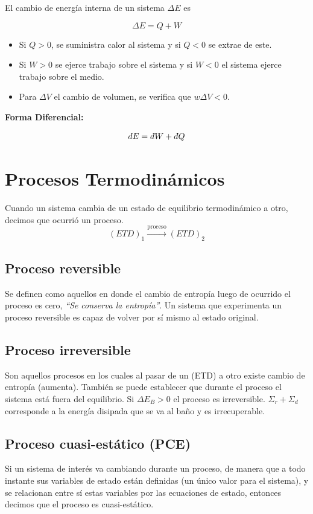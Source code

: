 El cambio de energía interna de un sistema $\Delta E$ es

\[\Delta E = Q+W\]

\begin{itemize}
    \item Si $Q>0$, se suministra calor al sistema y si $Q<0$ se extrae de este.
    \item Si $W>0$ se ejerce trabajo sobre el sistema y si $W<0$ el sistema ejerce trabajo sobre el medio.
    \item Para $\Delta V$ el cambio de volumen, se verifica que $w\Delta V < 0$.
\end{itemize}

\textbf{Forma Diferencial:}

\[dE = d\hspace*{-0.08em}\bar{}\hspace*{0.1em} W+ d\hspace*{-0.08em}\bar{}\hspace*{0.1em} Q\]

\section{Procesos Termodinámicos}

Cuando un sistema cambia de un estado de equilibrio termodinámico a otro, decimos que ocurrió un proceso.
\[(ETD)_1 \xrightarrow[]{\text{proceso}} (ETD)_2 \]

\subsection{Proceso reversible} Se definen como aquellos en donde el cambio de entropía luego de ocurrido el proceso es cero, \textit{\enquote{Se conserva la entropía}}. Un sistema que experimenta un proceso reversible es capaz de volver por sí mismo al estado original.
\\

\subsection{Proceso irreversible} Son aquellos procesos en los cuales al pasar de un (ETD) a otro existe cambio de entropía (aumenta). También se puede establecer que durante el proceso el sistema está fuera del equilibrio. Si $\Delta E_B > 0$ el proceso es irreversible. $\Sigma_r+\Sigma_d$ corresponde a la energía disipada que se va al baño y es irrecuperable.
\\

\subsection{Proceso cuasi-estático (PCE)} Si un sistema de interés va cambiando durante un proceso, de manera que a todo instante sus variables de estado están definidas (un único valor para el sistema), y se relacionan entre sí estas variables por las ecuaciones de estado, entonces decimos que el proceso es cuasi-estático. \\



